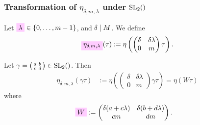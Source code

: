 \documentclass{article}
\begin{document}
\subsubsection{Transformation of $\eta_{\delta,m,\lambda}$ under
  $\SL2Z$}
  \label{sec:transformation-eta_delta-m-lambda}

Let $\defineNotation[lambda]{\lambda} \in \Set{0,\ldots,m-1}$, and
$\delta \mid M$.
%
We define
\begin{gather}
  \defineNotation[eta-delta-m-lambda-tau]{\eta_{\delta,m,\lambda}}(\tau)
  := \eta \left(
    \begin{pmatrix}\delta& \delta \lambda\\0&m\end{pmatrix} \tau
  \right).
\label{eq:eta_delta-m-lambda}
\end{gather}

Let
$\gamma=\left(\begin{smallmatrix}a&b\\c&d\end{smallmatrix}\right) \in
\SL2Z$.
%
Then
\begin{align}
  \eta_{\delta,m,\lambda}(\gamma \tau)
  &:= \eta
\left(
  \begin{pmatrix}\delta& \delta \lambda\\0&m\end{pmatrix}
  \gamma
  \tau
\right)
=
\eta(W \tau)
\end{align}
where
\begin{align}
  \defineNotation[W]{W}
  &:=
  \begin{pmatrix}
    \delta (a + c \lambda) & \delta (b + d \lambda)\\
    c m                   & d m
  \end{pmatrix}.
  \label{eq:W_delta-m-lambda}
\end{align}
\end{document}

